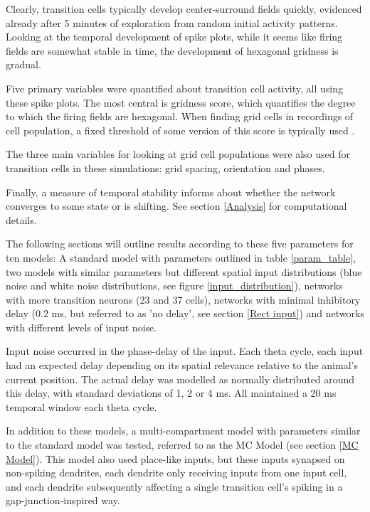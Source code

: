 \documentclass{article}
\begin{document}
    Clearly, transition cells typically develop center-surround fields quickly, evidenced already after 5 minutes of exploration from random initial activity patterns. Looking at the temporal development of spike plots, while it seems like firing fields are somewhat stable in time, the development of hexagonal gridness is gradual.

    Five primary variables were quantified about transition cell activity, all using these spike plots. The most central is gridness score, which quantifies the degree to which the firing fields are hexagonal. When finding grid cells in recordings of cell population, a fixed threshold of some version of this score is typically used \parencite{Sargolini2006}.
    
    The three main variables for looking at grid cell populations were also used for transition cells in these simulations: grid spacing, orientation and phases.
    
    Finally, a measure of temporal stability informs about whether the network converges to some state or is shifting. See section \ref{Analysis} for computational details.
    
    The following sections will outline results according to these five parameters for ten models: A standard model with parameters outlined in table \ref{param_table}, two models with similar parameters but different spatial input distributions (blue noise and white noise distributions, see figure \ref{input_distribution}), networks with more transition neurons (23 and 37 cells), networks with minimal inhibitory delay (0.2 ms, but referred to as 'no delay', see section \ref{Rect input}) and networks with different levels of input noise. 
    
    Input noise occurred in the phase-delay of the input. Each theta cycle, each input had an expected delay depending on its spatial relevance relative to the animal's current position. The actual delay was modelled as normally distributed around this delay, with standard deviations of 1, 2 or 4 ms. All maintained a 20 ms temporal window each theta cycle.

    In addition to these models, a multi-compartment model with parameters similar to the standard model was tested, referred to as the MC Model (see  section \ref{MC Model}). This model also used place-like inputs, but these inputs synapsed on non-spiking dendrites, each dendrite only receiving inputs from one input cell, and each dendrite subsequently affecting a single transition cell's spiking in a gap-junction-inspired way.
\end{document}
